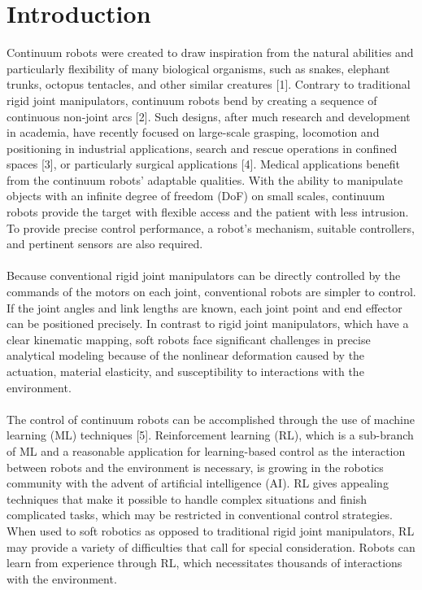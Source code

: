 \documentclass[12pt,twoside,a4]{mwbk}
\begin{document}
\chapter{Introduction}
Continuum robots were created to draw inspiration from the natural abilities and particularly flexibility of many biological organisms, such as snakes, elephant trunks, octopus tentacles, and other similar creatures [1]. Contrary to traditional rigid joint manipulators, continuum robots bend by creating a sequence of continuous non-joint arcs [2]. Such designs, after much research and development in academia, have recently focused on large-scale grasping, locomotion and positioning in industrial applications, search and rescue operations in confined spaces [3], or particularly surgical applications [4]. Medical applications benefit from the continuum robots' adaptable qualities. With the ability to manipulate objects with an infinite degree of freedom (DoF) on small scales, continuum robots provide the target with flexible access and the patient with less intrusion. To provide precise control performance, a robot's mechanism, suitable controllers, and pertinent sensors are also required.
\\ \\
Because conventional rigid joint manipulators can be directly controlled by the commands of the motors on each joint, conventional robots are simpler to control. If the joint angles and link lengths are known, each joint point and end effector can be positioned precisely. In contrast to rigid joint manipulators, which have a clear kinematic mapping, soft robots face significant challenges in precise analytical modeling because of the nonlinear deformation caused by the actuation, material elasticity, and susceptibility to interactions with the environment.
\\ \\
The control of continuum robots can be accomplished through the use of machine learning (ML) techniques [5]. Reinforcement learning (RL), which is a sub-branch of ML and a reasonable application for learning-based control as the interaction between robots and the environment is necessary, is growing in the robotics community with the advent of artificial intelligence (AI). RL gives appealing techniques that make it possible to handle complex situations and finish complicated tasks, which may be restricted in conventional control strategies. When used to soft robotics as opposed to traditional rigid joint manipulators, RL may provide a variety of difficulties that call for special consideration. Robots can learn from experience through RL, which necessitates thousands of interactions with the environment. 
\end{document}

